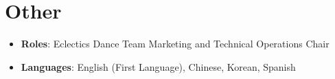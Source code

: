 \documentclass[letterpaper,11pt]{article}
\newcommand{\resumeItem}[2]{
  \item\small{
    \textbf{#1}{: #2 \vspace{-2pt}}
  }
}
\newcommand{\resumeSubItem}[2]{\resumeItem{#1}{#2}\vspace{-4pt}}
\newcommand{\resumeSubHeadingListStart}{\begin{itemize}[leftmargin=*]}
\newcommand{\resumeSubHeadingListEnd}{\end{itemize}}
\begin{document}
\section{Other}
  \resumeSubHeadingListStart
     \resumeSubItem{Roles}
      {Eclectics Dance Team Marketing and Technical Operations Chair}
    \resumeSubItem{Languages}
      {English (First Language), Chinese, Korean, Spanish}
  \resumeSubHeadingListEnd

\end{document}
